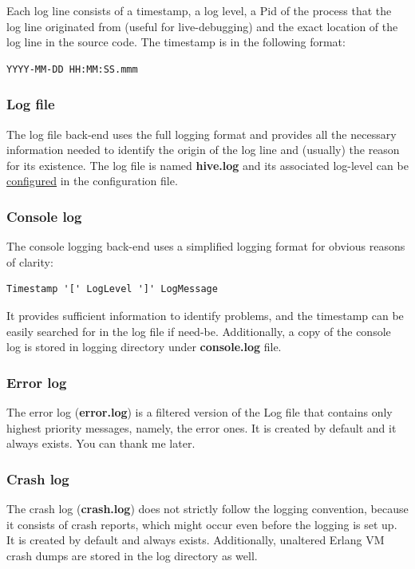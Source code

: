 \documentclass[a4paper]{article}
\begin{document}
\noindent
Each log line consists of a timestamp, a log level, a Pid of the process that the log line originated from (useful for live-debugging) and the exact location of the log line in the source code. The timestamp is in the following format:


\begin{verbatim}
YYYY-MM-DD HH:MM:SS.mmm
\end{verbatim}
\subsubsection{Log file}
\label{sec-5-1-1}

The log file back-end uses the full logging format and provides all the necessary information needed to identify the origin of the log line and (usually) the reason for its existence. The log file is named \textbf{hive.log} and its associated log-level can be \hyperref[sec-3-1-8]{configured} in the configuration file.
\subsubsection{Console log}
\label{sec-5-1-2}

The console logging back-end uses a simplified logging format for obvious reasons of clarity:


\begin{verbatim}
Timestamp '[' LogLevel ']' LogMessage
\end{verbatim}




\noindent
It provides sufficient information to identify problems, and the timestamp can be easily searched for in the log file if need-be.
Additionally, a copy of the console log is stored in logging directory under \textbf{console.log} file.
\subsubsection{Error log}
\label{sec-5-1-3}

The error log (\textbf{error.log}) is a filtered version of the Log file that contains only highest priority messages, namely, the error ones. It is created by default and it always exists. You can thank me later.
\subsubsection{Crash log}
\label{sec-5-1-4}

The crash log (\textbf{crash.log}) does not strictly follow the logging convention, because it consists of crash reports, which might occur even before the logging is set up. It is created by default and always exists. Additionally, unaltered Erlang VM crash dumps are stored in the log directory as well.
\end{document}
